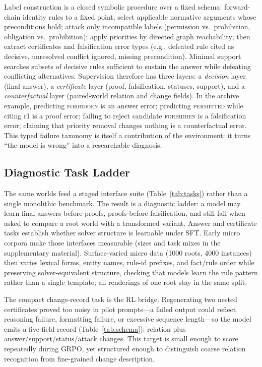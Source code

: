 \documentclass[letterpaper]{article}
\newcommand{\lab}[1]{\textsc{#1}}
\begin{document}
Label construction is a closed symbolic procedure over a fixed schema: forward-chain identity rules to a fixed point; select applicable normative arguments whose preconditions hold; attack only incompatible labels (permission vs.\ prohibition, obligation vs.\ prohibition); apply priorities by directed graph reachability; then extract certificates and falsification error types (e.g., defeated rule cited as decisive, unresolved conflict ignored, missing precondition). Minimal support searches subsets of decisive rules sufficient to sustain the answer while defeating conflicting alternatives. Supervision therefore has three layers: a \emph{decision} layer (final answer), a \emph{certificate} layer (proof, falsification, statuses, support), and a \emph{counterfactual} layer (paired-world relation and change fields). In the archive example, predicting \lab{forbidden} is an answer error; predicting \lab{permitted} while citing r1 is a proof error; failing to reject candidate \lab{forbidden} is a falsification error; claiming that priority removal changes nothing is a counterfactual error. This typed failure taxonomy is itself a contribution of the environment: it turns ``the model is wrong'' into a researchable diagnosis.

\subsection{Diagnostic Task Ladder}

The same worlds feed a staged interface suite (Table~\ref{tab:tasks}) rather than a single monolithic benchmark. The result is a diagnostic ladder: a model may learn final answers before proofs, proofs before falsification, and still fail when asked to compare a root world with a transformed variant. Answer and certificate tasks establish whether solver structure is learnable under SFT. Early micro corpora make those interfaces measurable (sizes and task mixes in the supplementary material). Surface-varied micro data (1000 roots, 4000 instances) then varies lexical forms, entity names, rule-id prefixes, and fact/rule order while preserving solver-equivalent structure, checking that models learn the rule pattern rather than a single template; all renderings of one root stay in the same split.

The compact change-record task is the RL bridge. Regenerating two nested certificates proved too noisy in pilot prompts---a failed output could reflect reasoning failure, formatting failure, or excessive sequence length---so the model emits a five-field record (Table~\ref{tab:schema}): relation plus answer/support/status/attack changes. This target is small enough to score repeatedly during GRPO, yet structured enough to distinguish coarse relation recognition from fine-grained change description.
\end{document}
